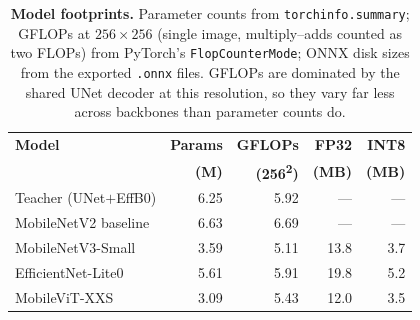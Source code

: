 \begin{table}[ht]
\centering
\caption{\textbf{Model footprints.} Parameter counts from \texttt{torchinfo.summary}; GFLOPs at $256{\times}256$ (single image, multiply--adds counted as two FLOPs) from PyTorch's \texttt{FlopCounterMode}; ONNX disk sizes from the exported \texttt{.onnx} files. GFLOPs are dominated by the shared UNet decoder at this resolution, so they vary far less across backbones than parameter counts do.}
\label{tab:t1-footprints}
\footnotesize
\setlength{\tabcolsep}{4pt}
\begin{tabular}{@{}lrrrr@{}}
\toprule
\textbf{Model} & \textbf{Params} & \textbf{GFLOPs} & \textbf{FP32} & \textbf{INT8} \\
               & \textbf{(M)}    & \textbf{(256\textsuperscript{2})} & \textbf{(MB)} & \textbf{(MB)} \\
\midrule
Teacher (UNet$+$EffB0)  & 6.25 & 5.92 & ---  & ---  \\
MobileNetV2 baseline    & 6.63 & 6.69 & ---  & ---  \\
MobileNetV3-Small       & 3.59 & 5.11 & 13.8 & 3.7  \\
EfficientNet-Lite0      & 5.61 & 5.91 & 19.8 & 5.2  \\
MobileViT-XXS           & 3.09 & 5.43 & 12.0 & 3.5  \\
\bottomrule
\end{tabular}
\end{table}
